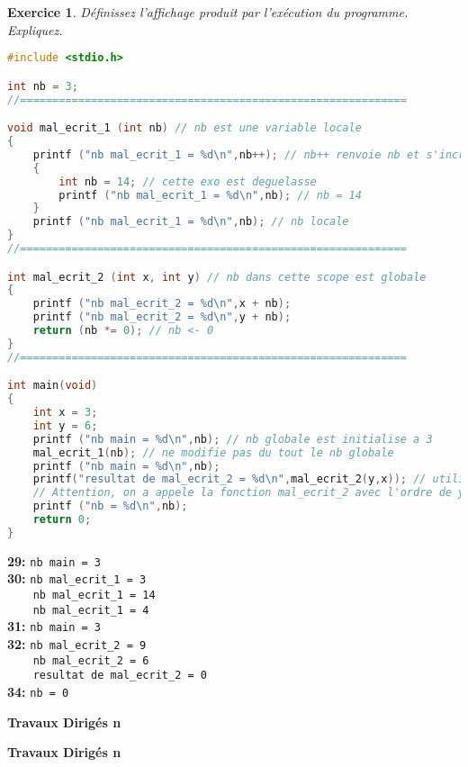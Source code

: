 \documentclass[a4paper]{article}
\newtheorem{exercice}{Exercice}
\theoremstyle{definition}
\begin{document}
\begin{exercice}
    D\'efinissez l'affichage produit par l'ex\'ecution du programme. Expliquez.
\end{exercice}
\begin{lstlisting}[language=C]
#include <stdio.h>

int nb = 3;
//============================================================

void mal_ecrit_1 (int nb) // nb est une variable locale
{
    printf ("nb mal_ecrit_1 = %d\n",nb++); // nb++ renvoie nb et s'incremente APRES
    {
        int nb = 14; // cette exo est deguelasse
        printf ("nb mal_ecrit_1 = %d\n",nb); // nb = 14
    }
    printf ("nb mal_ecrit_1 = %d\n",nb); // nb locale
}
//============================================================

int mal_ecrit_2 (int x, int y) // nb dans cette scope est globale
{
    printf ("nb mal_ecrit_2 = %d\n",x + nb);
    printf ("nb mal_ecrit_2 = %d\n",y + nb);
    return (nb *= 0); // nb <- 0
}
//============================================================

int main(void)
{
    int x = 3;
    int y = 6;
    printf ("nb main = %d\n",nb); // nb globale est initialise a 3
    mal_ecrit_1(nb); // ne modifie pas du tout le nb globale
    printf ("nb main = %d\n",nb);
    printf("resultat de mal_ecrit_2 = %d\n",mal_ecrit_2(y,x)); // utilise nb = 3, renvoie nb <- 0
    // Attention, on a appele la fonction mal_ecrit_2 avec l'ordre de y et x inverse
    printf ("nb = %d\n",nb);
    return 0;
}
\end{lstlisting}

\noindent \textbf{29:} \verb|nb main = 3|\\
\textbf{30:} \verb|nb mal_ecrit_1 = 3|\\
\verb|    nb mal_ecrit_1 = 14| \\
\verb|    nb mal_ecrit_1 = 4| \\
\textbf{31:} \verb|nb main = 3| \\
\textbf{32:} \verb|nb mal_ecrit_2 = 9| \\
\verb|    nb mal_ecrit_2 = 6|\\
\verb|    resultat de mal_ecrit_2 = 0|\\
\textbf{34:} \verb|nb = 0|

\begin{blank}
    \Large \raggedright \bf Travaux Dirig\'es n
\end{blank}

\begin{blank}
    \Large \raggedright \bf Travaux Dirig\'es n
\end{blank}
\end{document}
